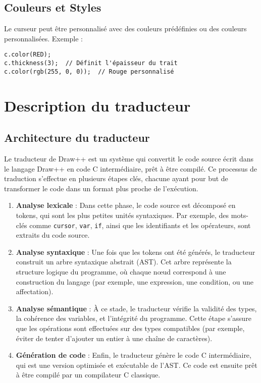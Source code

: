 \documentclass[12pt,a4paper]{report}
\begin{document}
\section{Couleurs et Styles}
Le curseur peut être personnalisé avec des couleurs prédéfinies ou des couleurs personnalisées. Exemple :
\begin{lstlisting}[language=Draw++]
c.color(RED);
c.thickness(3);  // Définit l'épaisseur du trait
c.color(rgb(255, 0, 0));  // Rouge personnalisé
\end{lstlisting}



\chapter{Description du traducteur}

\section{Architecture du traducteur}
Le traducteur de Draw++ est un système qui convertit le code source écrit dans le langage Draw++ en code C intermédiaire, prêt à être compilé. Ce processus de traduction s'effectue en plusieurs étapes clés, chacune ayant pour but de transformer le code dans un format plus proche de l'exécution.

\begin{enumerate}
    \item \textbf{Analyse lexicale} : Dans cette phase, le code source est décomposé en tokens, qui sont les plus petites unités syntaxiques. Par exemple, des mots-clés comme \texttt{cursor}, \texttt{var}, \texttt{if}, ainsi que les identifiants et les opérateurs, sont extraits du code source.
    \item \textbf{Analyse syntaxique} : Une fois que les tokens ont été générés, le traducteur construit un arbre syntaxique abstrait (AST). Cet arbre représente la structure logique du programme, où chaque nœud correspond à une construction du langage (par exemple, une expression, une condition, ou une affectation).
    \item \textbf{Analyse sémantique} : À ce stade, le traducteur vérifie la validité des types, la cohérence des variables, et l'intégrité du programme. Cette étape s'assure que les opérations sont effectuées sur des types compatibles (par exemple, éviter de tenter d'ajouter un entier à une chaîne de caractères).
    \item \textbf{Génération de code} : Enfin, le traducteur génère le code C intermédiaire, qui est une version optimisée et exécutable de l'AST. Ce code est ensuite prêt à être compilé par un compilateur C classique.
\end{enumerate}
\end{document}
